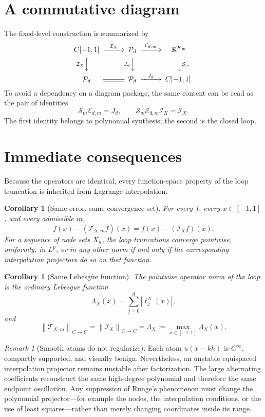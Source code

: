 \documentclass[11pt,oneside]{book}
\newtheorem{corollary}[theorem]{Corollary}
\theoremstyle{definition}
\theoremstyle{remark}
\newtheorem{remark}[theorem]{Remark}
\newcommand{\R}{\mathbb R}
\newcommand{\Pp}{\mathcal P}
\newcommand{\Iop}{\mathcal I}
\newcommand{\Sop}{\mathcal S}
\newcommand{\Eop}{\mathcal E}
\newcommand{\Top}{\mathcal T}
\newcommand{\norm}[1]{\left\lVert#1\right\rVert}
\newcommand{\abs}[1]{\left\lvert#1\right\rvert}
\begin{document}
\section{A commutative diagram}
The fixed-level construction is summarized by
\[
\begin{CD}
 C[-1,1] @>{\Iop_X}>> \Pp_d @>{\Eop_{d,m}}>> \R^{K_m}\\
 @V{\Iop_X}VV @V{J_d}VV @VV{\Sop_m}V\\
 \Pp_d @= \Pp_d @>{J_d}>> C[-1,1].
\end{CD}
\]
To avoid a dependency on a diagram package, the same content can be read as the pair of identities
\[
 \Sop_m\Eop_{d,m}=J_d,
 \qquad
 \Sop_m\Eop_{d,m}\Iop_X=\Iop_X.
\]
The first identity belongs to polynomial synthesis; the second is the closed loop.

\section{Immediate consequences}
Because the operators are identical, every function-space property of the loop truncation is inherited from Lagrange interpolation.

\begin{corollary}[Same error, same convergence set]
\label{cor:same-error}
For every \(f\), every \(x\in[-1,1]\), and every admissible \(m\),
\begin{equation}
 f(x)-(\Top_{X,m}f)(x)=f(x)-(\Iop_Xf)(x).
 \label{eq:same-error}
\end{equation}
For a sequence of node sets \(X_n\), the loop truncations converge pointwise, uniformly, in \(L^p\), or in any other norm if and only if the corresponding interpolation projectors do so on that function.
\end{corollary}

\begin{corollary}[Same Lebesgue function]
\label{cor:same-lebesgue}
The pointwise operator norm of the loop is the ordinary Lebesgue function
\begin{equation}
 \Lambda_X(x)=\sum_{j=0}^{d}\abs{\ell_j^X(x)},
 \label{eq:lebesgue-function}
\end{equation}
and
\begin{equation}
 \norm{\Top_{X,m}}_{C\to C}
 =\norm{\Iop_X}_{C\to C}
 =\Lambda_X:=\max_{x\in[-1,1]}\Lambda_X(x).
 \label{eq:lebesgue-constant}
\end{equation}
\end{corollary}

\begin{remark}[Smooth atoms do not regularize]
Each atom \(u(x-kh)\) is \(C^\infty\), compactly supported, and visually benign.  Nevertheless, an unstable equispaced interpolation projector remains unstable after factorization.  The large alternating coefficients reconstruct the same high-degree polynomial and therefore the same endpoint oscillation.  Any suppression of Runge's phenomenon must change the polynomial projector---for example the nodes, the interpolation conditions, or the use of least squares---rather than merely changing coordinates inside its range.
\end{remark}
\end{document}
